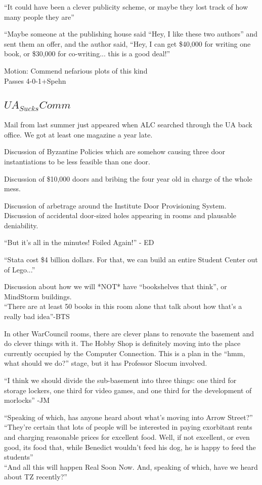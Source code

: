 \documentclass[10pt]{article}
\begin{document}
``It could have been a clever publicity scheme, or maybe they lost
track of how many people they are''

``Maybe someone at the publishing house said ``Hey, I like
these two authors'' and sent them an offer, and the author said,
``Hey, I can get \$40,000 for writing one book, or \$30,000 for
co-writing... this is a good deal!''

Motion: Commend nefarious plots of this kind\\
Passes 4-0-1+Spehn

\subsection{$UA_{Sucks}Comm$}
Mail from last summer just appeared when ALC searched through the UA
back office.  We got at least one magazine a year late.

Discussion of Byzantine Policies which are somehow causing three door
instantiations to be less feasible than one door.  

Discussion of \$10,000 doors and bribing the four year old in charge
of the whole mess.

Discussion of arbetrage around the Institute Door Provisioning System.
Discussion of accidental door-sized holes appearing in rooms and
plausable deniability.

``But it's all in the minutes! Foiled Again!'' - ED

``Stata cost \$4 billion dollars. For that, we can build an entire
Student Center out of Lego...''

Discussion about how we will *NOT* have ``bookshelves that think'',
or MindStorm buildings.\\
``There are at least 50 books in this room alone that talk about how
that's a really bad idea''-BTS

In other WarCouncil rooms, there are clever plans to renovate the
basement and do clever things with it.  The Hobby Shop is definitely
moving into the place currently occupied by the Computer
Connection. This is a plan in the ``hmm, what should we do?'' stage,
but it has Professor Slocum involved.

``I think we should divide the sub-basement into three things: one
third for storage lockers, one third for video games, and one third
for the development of morlocks'' -JM

``Speaking of which, has anyone heard about what's moving into Arrow
Street?''\\
``They're certain that lots of people will be interested in paying
exorbitant rents and charging reasonable prices for excellent food.
Well, if not excellent, or even good, its food that, while
Benedict wouldn't feed his dog, he is happy to feed the students''\\
``And all this will happen Real Soon Now.  And, speaking of which,
have we heard about TZ recently?''\\
\end{document}
